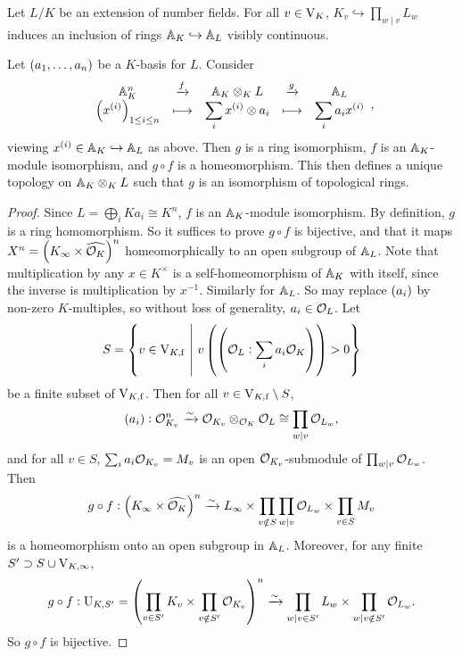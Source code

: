 
Let $ L / K $ be an extension of number fields. For all $ v \in \V_K $, $ K_v \hookrightarrow \prod_{w \mid v} L_w $ induces an inclusion of rings $ \AA_K \hookrightarrow \AA_L $ visibly continuous.

\begin{proposition}
\label{prop:6.3}
Let $ \br{a_1, \dots, a_n} $ be a $ K $-basis for $ L $. Consider
$$
\begin{array}{ccccc}
\AA_K^n & \xrightarrow{f} & \AA_K \otimes_K L & \xrightarrow{g} & \AA_L \\
\displaystyle\br{x^{\br{i}}}_{1 \le i \le n} & \longmapsto & \displaystyle\sum_i x^{\br{i}} \otimes a_i & \longmapsto & \displaystyle\sum_i a_ix^{\br{i}}
\end{array},
$$
viewing $ x^{\br{i}} \in \AA_K \hookrightarrow \AA_L $ as above. Then $ g $ is a ring isomorphism, $ f $ is an $ \AA_K $-module isomorphism, and $ g \circ f $ is a homeomorphism. This then defines a unique topology on $ \AA_K \otimes_K L $ such that $ g $ is an isomorphism of topological rings.
\end{proposition}

\begin{proof}
Since $ L = \bigoplus_i Ka_i \cong K^n $, $ f $ is an $ \AA_K $-module isomorphism. By definition, $ g $ is a ring homomorphism. So it suffices to prove $ g \circ f $ is bijective, and that it maps $ X^n = \br{K_\infty \times \widehat{\OOO_K}}^n $ homeomorphically to an open subgroup of $ \AA_L $. Note that multiplication by any $ x \in K^\times $ is a self-homeomorphism of $ \AA_K $ with itself, since the inverse is multiplication by $ x^{-1} $. Similarly for $ \AA_L $. So may replace $ \br{a_i} $ by non-zero $ K $-multiples, so without loss of generality, $ a_i \in \OOO_L $. Let
$$ S = \cbr{v \in \V_{K, \f} \st v\br{\br{\OOO_L : \sum_i a_i\OOO_K}} > 0} $$
be a finite subset of $ \V_{K, \f} $. Then for all $ v \in \V_{K, \f} \setminus S $,
$$ \br{a_i} : \OOO_{K_v}^n \xrightarrow{\sim} \OOO_{K_v} \otimes_{\OOO_K} \OOO_L \cong \prod_{w \mid v} \OOO_{L_w}, $$
and for all $ v \in S $, $ \sum_i a_i\OOO_{K_v} = M_v $ is an open $ \OOO_{K_v} $-submodule of $ \prod_{w \mid v} \OOO_{L_w} $. Then
$$ g \circ f : \br{K_\infty \times \widehat{\OOO_K}}^n \xrightarrow{\sim} L_\infty \times \prod_{v \notin S} \prod_{w \mid v} \OOO_{L_w} \times \prod_{v \in S} M_v $$
is a homeomorphism onto an open subgroup in $ \AA_L $. Moreover, for any finite $ S' \supset S \cup \V_{K, \infty} $,
$$ g \circ f : \U_{K, S'} = \br{\prod_{v \in S'} K_v \times \prod_{v \notin S'} \OOO_{K_v}}^n \xrightarrow{\sim} \prod_{w \mid v \in S'} L_w \times \prod_{w \mid v \notin S'} \OOO_{L_w}. $$
So $ g \circ f $ is bijective.
\end{proof}

